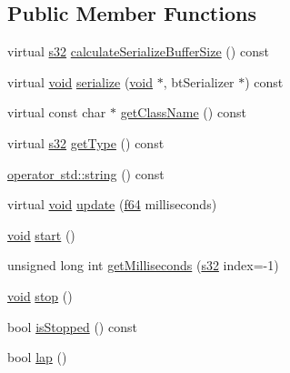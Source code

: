 \subsection*{Public Member Functions}
\begin{DoxyCompactItemize}
\item 
virtual \mbox{\hyperlink{_util_8h_aa62c75d314a0d1f37f79c4b73b2292e2}{s32}} \mbox{\hyperlink{classnjli_1_1_stop_watch_a72e1052a6525fe6d6887bd985b1ef8d3}{calculate\+Serialize\+Buffer\+Size}} () const
\item 
virtual \mbox{\hyperlink{_thread_8h_af1e856da2e658414cb2456cb6f7ebc66}{void}} \mbox{\hyperlink{classnjli_1_1_stop_watch_ae0d61d085799cf5f132cf92c65b48cdc}{serialize}} (\mbox{\hyperlink{_thread_8h_af1e856da2e658414cb2456cb6f7ebc66}{void}} $\ast$, bt\+Serializer $\ast$) const
\item 
virtual const char $\ast$ \mbox{\hyperlink{classnjli_1_1_stop_watch_a70283751febb463682cf4126c970aaa5}{get\+Class\+Name}} () const
\item 
virtual \mbox{\hyperlink{_util_8h_aa62c75d314a0d1f37f79c4b73b2292e2}{s32}} \mbox{\hyperlink{classnjli_1_1_stop_watch_a9f6f6c44d2c6137a8bb38720e2ccbfbc}{get\+Type}} () const
\item 
\mbox{\hyperlink{classnjli_1_1_stop_watch_a841749dbe95a638802a2e7d69e0388c0}{operator std\+::string}} () const
\item 
virtual \mbox{\hyperlink{_thread_8h_af1e856da2e658414cb2456cb6f7ebc66}{void}} \mbox{\hyperlink{classnjli_1_1_stop_watch_a0ab1925582a66c67c1db0bf9f731f4cc}{update}} (\mbox{\hyperlink{_util_8h_a94dab5770726ccbef8c7d026cfbdf8e5}{f64}} milliseconds)
\item 
\mbox{\hyperlink{_thread_8h_af1e856da2e658414cb2456cb6f7ebc66}{void}} \mbox{\hyperlink{classnjli_1_1_stop_watch_a86c10437140b1a885228b17dca3697d4}{start}} ()
\item 
unsigned long int \mbox{\hyperlink{classnjli_1_1_stop_watch_aa18f65d2873cb83258cca59d2e9e600f}{get\+Milliseconds}} (\mbox{\hyperlink{_util_8h_aa62c75d314a0d1f37f79c4b73b2292e2}{s32}} index=-\/1)
\item 
\mbox{\hyperlink{_thread_8h_af1e856da2e658414cb2456cb6f7ebc66}{void}} \mbox{\hyperlink{classnjli_1_1_stop_watch_a611f4cc1cd65b7099db654f1052c6910}{stop}} ()
\item 
bool \mbox{\hyperlink{classnjli_1_1_stop_watch_a63dc587580584f4574df3830c84b1da1}{is\+Stopped}} () const
\item 
bool \mbox{\hyperlink{classnjli_1_1_stop_watch_a94fa6e3e6b10171d826141c1c5c6dd50}{lap}} ()

\end{DoxyCompactItemize}
